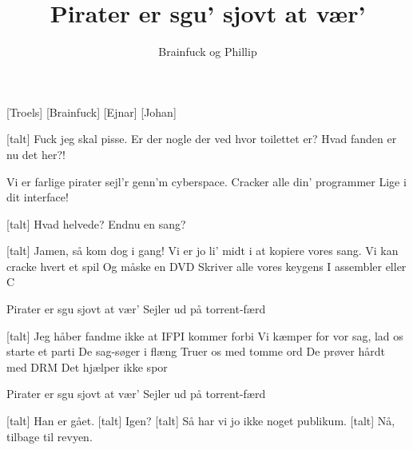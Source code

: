\documentclass[a4paper,11pt]{article}
\title{Pirater er sgu' sjovt at vær'}
\author{Brainfuck og Phillip}
\begin{document}
\maketitle

\begin{roles} 
[Troels]
[Brainfuck]
[Ejnar]
[Johan]
\end{roles}

\begin{song}



[talt] Fuck jeg skal pisse.   Er der nogle der
   ved hvor toilettet er?   Hvad fanden er nu det her?!

 Vi er farlige pirater
 sejl'r genn'm cyberspace.
 Cracker alle din' programmer
 Lige i dit interface!

[talt] Hvad helvede? Endnu en sang?

[talt] Jamen, så kom dog i gang!
 Vi er jo li' midt i at kopiere vores sang.
 Vi kan cracke hvert et spil
 Og måske en DVD
 Skriver alle vores keygens
 I assembler eller C

 Pirater er sgu sjovt at vær'
 Sejler ud på torrent-færd

[talt] Jeg håber fandme ikke at IFPI kommer forbi
 Vi kæmper for vor sag, lad os starte et parti
 De sag-søger i flæng
 Truer os med tomme ord
 De prøver hårdt med DRM
 Det hjælper ikke spor

 Pirater er sgu sjovt at vær'
 Sejler ud på torrent-færd


[talt] Han er gået.
[talt] Igen?
[talt] Så har vi jo ikke noget publikum.
[talt] Nå, tilbage til revyen.


\end{song}
\end{document}
